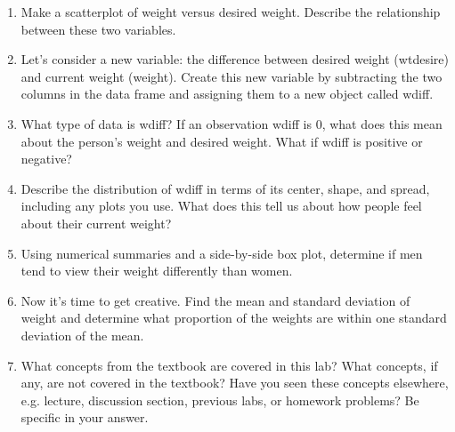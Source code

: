 \documentclass{article}\usepackage[]{graphicx}\usepackage[]{color}
\newcommand{\hlstd}[1]{\textcolor[rgb]{0.345,0.345,0.345}{#1}}%
\begin{document}
\begin{enumerate}
\item Make a scatterplot of weight versus desired weight. Describe the relationship between these two variables.
\item Let's consider a new variable: the difference between desired weight (\hlstd{wtdesire}) and current weight (\hlstd{weight}). Create this new variable by subtracting the two columns in the data frame and assigning them to a new object called \hlstd{wdiff}.
\item What type of data is \hlstd{wdiff}? If an observation \hlstd{wdiff} is 0, what does this mean about the person's weight and desired weight. What if \hlstd{wdiff} is positive or negative?
\item Describe the distribution of \hlstd{wdiff} in terms of its center, shape, and spread, including any plots you use. What does this tell us about how people feel about their current weight?
\item Using numerical summaries and a side-by-side box plot, determine if men tend to view their weight differently than women.
\item Now it's time to get creative. Find the mean and standard deviation of \hlstd{weight} and determine what proportion of the weights are within one standard deviation of the mean.
\item What concepts from the textbook are covered in this lab?  What concepts, if any, are not covered in the textbook?  Have you seen these concepts elsewhere, e.g. lecture, discussion section, previous labs, or homework problems?  Be specific in your answer.
\end{enumerate}
\end{document}
